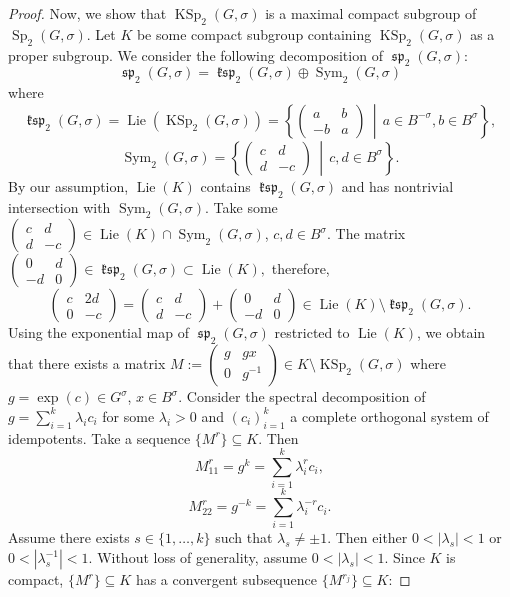 \documentclass[a4paper,oneside,11pt]{amsart}
\DeclareMathOperator{\Sym}{Sym}
\DeclareMathOperator{\Sp}{Sp}
\DeclareMathOperator{\spp}{\mathfrak{sp}}
\DeclareMathOperator{\ksp}{\mathfrak{ksp}}
\DeclareMathOperator{\Lie}{Lie}
\DeclareMathOperator{\KSp}{KSp}
\newcommand{\midwd}{\,\middle\vert\,}
\theoremstyle{plain}
\theoremstyle{definition}
\theoremstyle{remark}
\newcommand{\bs}{\setminus}
\begin{document}
\begin{proof}
Now, we show that $\KSp_2(G,\sigma)$ is a maximal compact subgroup of $\Sp_2(G,\sigma)$. Let $K$ be some compact subgroup containing $\KSp_2(G,\sigma)$ as a proper subgroup. We consider the following decomposition of $\spp_2(G,\sigma)$:
$$\spp_2(G,\sigma)=\ksp_2(G,\sigma)\oplus\Sym_2(G,\sigma)$$
where
$$\ksp_2(G,\sigma)=\Lie(\KSp_2(G,\sigma))=\left\{
\begin{pmatrix}
a & b \\
-b & a
\end{pmatrix}
\midwd a\in B^{-\sigma}, b\in B^{\sigma}
\right\},$$
$$\Sym_2(G,\sigma)=\left\{
\begin{pmatrix}
c & d \\
d & -c
\end{pmatrix}
\midwd c,d\in B^{\sigma}
\right\}.$$
By our assumption, $\Lie(K)$ contains $\ksp_2(G,\sigma)$ and has nontrivial intersection with $\Sym_2(G,\sigma)$. Take some $\begin{pmatrix}
c & d \\
d & -c
\end{pmatrix}\in\Lie(K)\cap\Sym_2(G,\sigma)$, $c,d\in B^{\sigma}$. The matrix
$\begin{pmatrix}
0 & d \\
-d & 0
\end{pmatrix}\in\ksp_2(G,\sigma)\subset\Lie(K),$
therefore,
$$\begin{pmatrix}
c & 2d \\
0 & -c
\end{pmatrix}=\begin{pmatrix}
c & d \\
d & -c
\end{pmatrix}+\begin{pmatrix}
0 & d \\
-d & 0
\end{pmatrix}\in\Lie(K)\bs\ksp_2(G,\sigma).$$
Using the exponential map of $\spp_2(G,\sigma)$ restricted to $\Lie(K)$, we obtain that there exists a matrix $M:=\begin{pmatrix}
g & gx \\
0 & g^{-1}
\end{pmatrix}\in K\bs\KSp_2(G,\sigma)$ where $g=\exp(c)\in G^{\sigma}$, $x\in B^{\sigma}$. Consider the spectral decomposition of $g=\sum_{i=1}^k\lambda_ic_i$ for some $\lambda_i>0$ and $(c_i)_{i=1}^k$ a complete orthogonal system of idempotents. Take a sequence $\{M^r\}\subseteq K$. Then $$M^r_{11}=g^k=\sum_{i=1}^k\lambda_i^rc_i,$$
$$M^r_{22}=g^{-k}=\sum_{i=1}^k\lambda_i^{-r}c_i.$$
Assume there exists $s\in\{1,\dots,k\}$ such that $\lambda_s\neq\pm 1$. Then either $0<|\lambda_s|<1$ or $0<|\lambda_s^{-1}|<1$. Without loss of generality, assume $0<|\lambda_s|<1$. Since $K$ is compact, $\{M^r\}\subseteq K$ has a convergent subsequence $\{M^{r_j}\}\subseteq K$:

\end{proof}
\end{document}
